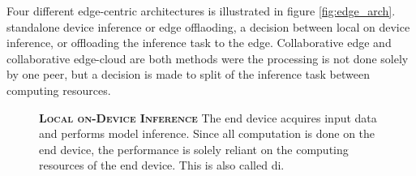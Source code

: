 Four different edge-centric architectures is illustrated in figure \ref{fig:edge_arch}. \protect{} standalone device inference or \protect{} edge offlaoding, a decision between local on device inference, or offloading the inference task to the edge. Collaborative edge\protect{} and collaborative edge-cloud \protect{} are both methods were the processing is not done solely by one peer, but a decision is made to split of the inference task between computing resources.
\begin{figure}
	\begin{minipage}{0.65\linewidth}
		\textbf{\protect{} \textsc{Local on-Device Inference}}
		\color{caption-color} \newline
		The end device acquires input data and performs model inference. Since all computation is done on the end device, the performance is solely reliant on the computing resources of the end device. This is also called \acrlong{di}.
	\end{minipage}%
	\hfill
	\begin{minipage}{0.3\linewidth}
		\centering
		\captionsetup[subfigure]{justification=centering}
		\begin{figure}
			\centering
		\end{figure}
	\end{minipage}
	

\end{figure}
